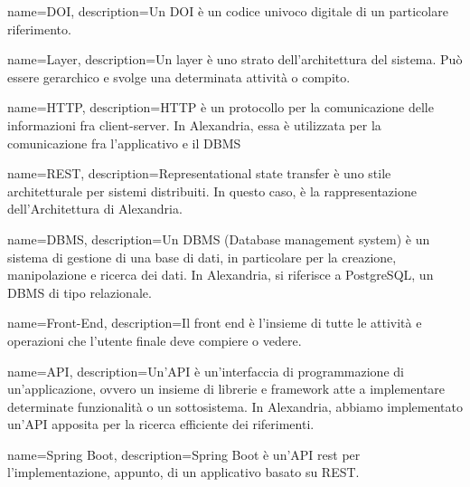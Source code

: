 {
    name={DOI},
    description={Un DOI è un codice univoco digitale di un particolare riferimento.}
}

{
    name={Layer},
    description={Un layer è uno strato dell'architettura del sistema. Può essere gerarchico e svolge una determinata attività o compito.}
}

{
    name={HTTP},
    description={HTTP è un protocollo per la comunicazione delle informazioni fra client-server. In Alexandria, essa è utilizzata per la comunicazione fra l'applicativo e il DBMS}
}

{
    name={REST},
    description={Representational state transfer è uno stile architetturale per sistemi distribuiti. In questo caso, è la rappresentazione dell'Architettura di Alexandria.}
}

{
    name={DBMS},
    description={Un DBMS (Database management system) è un sistema di gestione di una base di dati, in particolare per la creazione, manipolazione e ricerca dei dati. In Alexandria, si riferisce a PostgreSQL, un DBMS di tipo relazionale.}
}


{
    name={Front-End},
    description={Il front end è l'insieme di tutte le attività e operazioni che l'utente finale deve compiere o vedere.}
}

{
    name={API},
    description={Un'API è un'interfaccia di programmazione di un'applicazione, ovvero un insieme di librerie e framework atte a implementare determinate funzionalità o un sottosistema. In Alexandria, abbiamo implementato un'API apposita per la ricerca efficiente dei riferimenti.}
}

{
    name={Spring Boot},
    description={Spring Boot è un'API rest per l'implementazione, appunto, di un applicativo basato su REST.}
}

\printglossaries

